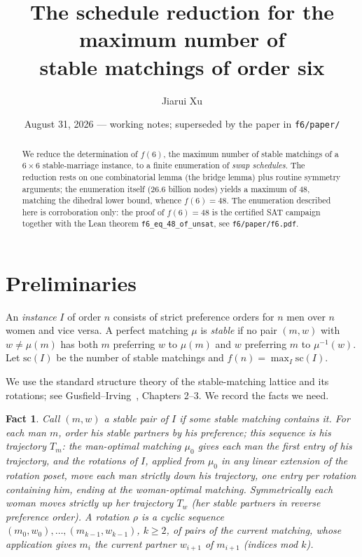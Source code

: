 \documentclass[11pt]{article}
\title{The schedule reduction for the maximum number of\\ stable matchings of order six}
\author{Jiarui Xu}
\date{August 31, 2026 --- working notes; superseded by the paper in \texttt{f6/paper/}}
\newtheorem{fact}{Fact}
\begin{document}
\maketitle

\begin{abstract}
We reduce the determination of $f(6)$, the maximum number of stable matchings of a
$6\times 6$ stable-marriage instance, to a finite enumeration of \emph{swap schedules}.
The reduction rests on one combinatorial lemma (the bridge lemma) plus routine symmetry
arguments; the enumeration itself (26.6 billion nodes) yields a maximum of $48$,
matching the dihedral lower bound, whence $f(6)=48$.
The enumeration described here is corroboration only: the proof of $f(6)=48$ is the
certified SAT campaign together with the Lean theorem \texttt{f6\_eq\_48\_of\_unsat},
see \texttt{f6/paper/f6.pdf}.
\end{abstract}

\section{Preliminaries}

An \emph{instance} $I$ of order $n$ consists of strict preference orders for $n$ men over
$n$ women and vice versa. A perfect matching $\mu$ is \emph{stable} if no pair $(m,w)$
with $w\ne\mu(m)$ has both $m$ preferring $w$ to $\mu(m)$ and $w$ preferring $m$ to
$\mu^{-1}(w)$. Let $\mathrm{sc}(I)$ be the number of stable matchings and
$f(n)=\max_I \mathrm{sc}(I)$.

We use the standard structure theory of the stable-matching lattice and its rotations;
see Gusfield--Irving~\cite{gi89}, Chapters 2--3. We record the facts we need.

\begin{fact}\label{fact:pairs}
Call $(m,w)$ a \emph{stable pair} of $I$ if some stable matching contains it. For each
man $m$, order his stable partners by his preference; this sequence is his
\emph{trajectory} $T_m$: the man-optimal matching $\mu_0$ gives each man the first entry
of his trajectory, and the rotations of $I$, applied from $\mu_0$ in any linear
extension of the rotation poset, move each man strictly down his trajectory, one entry
per rotation containing him, ending at the woman-optimal matching. Symmetrically each
woman moves strictly up her trajectory $T_w$ (her stable partners in reverse preference
order). A rotation $\rho$ is a cyclic sequence $(m_0,w_0),\dots,(m_{k-1},w_{k-1})$,
$k\ge 2$, of pairs of the current matching, whose application gives $m_i$ the current
partner $w_{i+1}$ of $m_{i+1}$ (indices mod $k$).
\end{fact}
\end{document}
